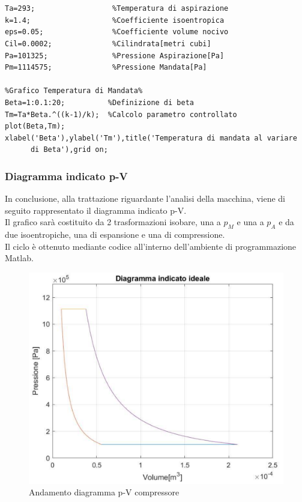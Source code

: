 \\
\\
\begin{lstlisting}[frame=trBL]
%%Dati
Ta=293;                  %Temperatura di aspirazione
k=1.4;                   %Coefficiente isoentropica
eps=0.05;                %Coefficiente volume nocivo
Cil=0.0002;              %Cilindrata[metri cubi]
Pa=101325;               %Pressione Aspirazione[Pa]
Pm=1114575;              %Pressione Mandata[Pa]

%Grafico Temperatura di Mandata%
Beta=1:0.1:20;          %Definizione di beta
Tm=Ta*Beta.^((k-1)/k);  %Calcolo parametro controllato 
plot(Beta,Tm);
xlabel('Beta'),ylabel('Tm'),title('Temperatura di mandata al variare 
      di Beta'),grid on;
\end{lstlisting}
\subsubsection{Diagramma indicato p-V}In conclusione, alla trattazione riguardante l’analisi della macchina, viene di seguito rappresentato il diagramma indicato p-V. \\
Il grafico sarà costituito da 2 trasformazioni isobare, una a $p_M$ e una a $p_A$ e da due isoentropiche, una di espansione e una di compressione. \\
Il ciclo è ottenuto mediante codice all’interno dell’ambiente di programmazione Matlab. 
\begin{figure}[h]
    \centering
    \includegraphics[scale=0.6]{Immagini/GraficopV.png}
    \caption{Andamento diagramma p-V compressore}
    \label{fig:GraficopV}
\end{figure}
